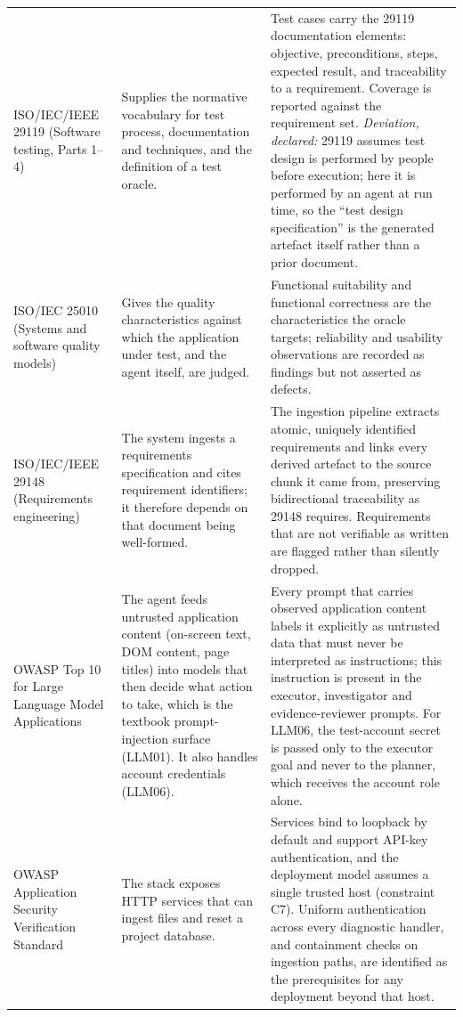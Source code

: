 \begin{xltabular}{\textwidth}{@{}>{\hsize}Y>{\hsize}Y>{\hsize}Y@{}}
  ISO/IEC/IEEE 29119 (Software testing, Parts 1--4)~\cite{iso29119} & Supplies the normative vocabulary for test process, documentation and techniques, and the definition of a test oracle. & Test cases carry the 29119 documentation elements: objective, preconditions, steps, expected result, and traceability to a requirement. Coverage is reported against the requirement set. \emph{Deviation, declared:} 29119 assumes test design is performed by people before execution; here it is performed by an agent at run time, so the ``test design specification'' is the generated artefact itself rather than a prior document. \\
  \addlinespace
  ISO/IEC 25010 (Systems and software quality models)~\cite{iso25010} & Gives the quality characteristics against which the application under test, and the agent itself, are judged. & Functional suitability and functional correctness are the characteristics the oracle targets; reliability and usability observations are recorded as findings but not asserted as defects. \\
  \addlinespace
  ISO/IEC/IEEE 29148 (Requirements engineering)~\cite{iso29148} & The system ingests a requirements specification and cites requirement identifiers; it therefore depends on that document being well-formed. & The ingestion pipeline extracts atomic, uniquely identified requirements and links every derived artefact to the source chunk it came from, preserving bidirectional traceability as 29148 requires. Requirements that are not verifiable as written are flagged rather than silently dropped. \\
  \addlinespace
  OWASP Top 10 for Large Language Model Applications~\cite{owaspllm} & The agent feeds untrusted application content (on-screen text, DOM content, page titles) into models that then decide what action to take, which is the textbook prompt-injection surface (LLM01). It also handles account credentials (LLM06). & Every prompt that carries observed application content labels it explicitly as untrusted data that must never be interpreted as instructions; this instruction is present in the executor, investigator and evidence-reviewer prompts. For LLM06, the test-account secret is passed only to the executor goal and never to the planner, which receives the account role alone. \\
  \addlinespace
  OWASP Application Security Verification Standard & The stack exposes HTTP services that can ingest files and reset a project database. & Services bind to loopback by default and support API-key authentication, and the deployment model assumes a single trusted host (constraint C7). Uniform authentication across every diagnostic handler, and containment checks on ingestion paths, are identified as the prerequisites for any deployment beyond that host. \\

\end{xltabular}
